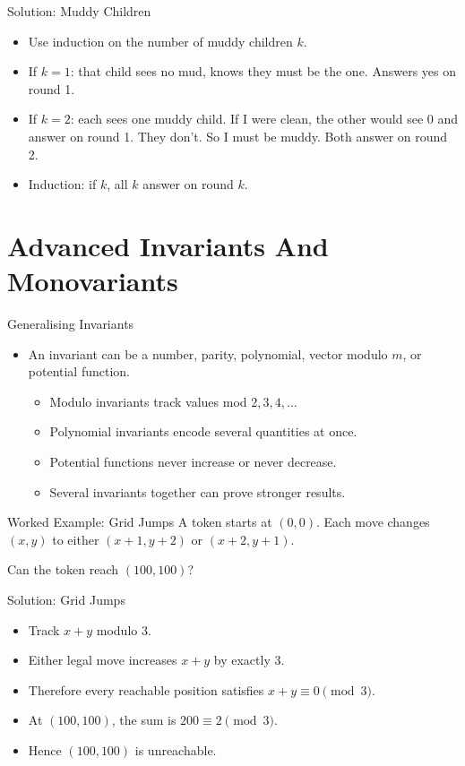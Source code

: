 \documentclass{beamer}
\begin{document}
\begin{frame}{Solution: Muddy Children}
    \pause
    \begin{itemize}
        \item Use induction on the number of muddy children $k$.
        \item If $k=1$: that child sees no mud, knows they must be the
            one. Answers yes on round 1.
        \item If $k=2$: each sees one muddy child. If I were clean, the
            other would see 0 and answer on round 1. They don't. So I must
            be muddy. Both answer on round 2.
        \item Induction: if $k$, all $k$ answer on round $k$.
    \end{itemize}
\end{frame}

\section{Advanced Invariants And Monovariants}

\begin{frame}{Generalising Invariants}
    \pause
    \begin{itemize}
        \item An invariant can be a number, parity, polynomial, vector
            modulo $m$, or potential function.
            \begin{itemize}
                \item Modulo invariants track values mod $2,3,4,\ldots$
                \item Polynomial invariants encode several quantities at once.
                \item Potential functions never increase or never decrease.
                \item Several invariants together can prove stronger results.
            \end{itemize}
    \end{itemize}
\end{frame}

\begin{frame}{Worked Example: Grid Jumps}
    A token starts at $(0,0)$. Each move changes $(x,y)$ to either
    $(x+1,y+2)$ or $(x+2,y+1)$.

    Can the token reach $(100,100)$?
\end{frame}

\begin{frame}{Solution: Grid Jumps}
    \pause
    \begin{itemize}
        \item Track $x+y$ modulo 3.
        \item Either legal move increases $x+y$ by exactly 3.
        \item Therefore every reachable position satisfies
            $x+y\equiv0\pmod3$.
        \item At $(100,100)$, the sum is $200\equiv2\pmod3$.
        \item Hence $(100,100)$ is unreachable.
    \end{itemize}
\end{frame}
\end{document}

